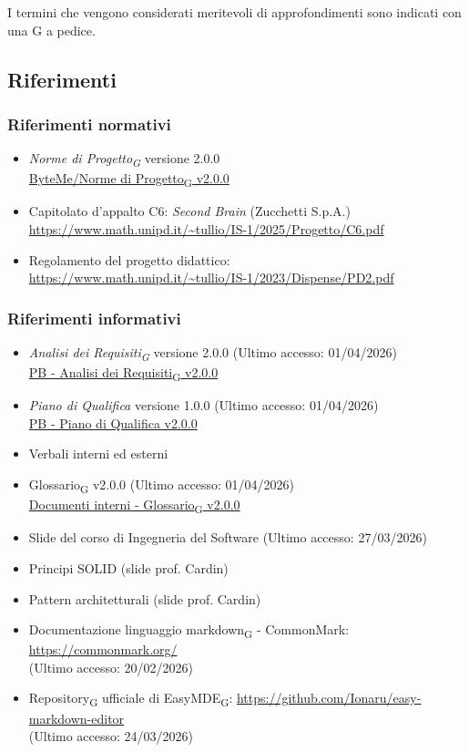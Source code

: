 \documentclass[11pt,a4paper]{article}
\newcommand{\gls}[1]{#1\textsubscript{G}}
\begin{document}
I termini che vengono considerati meritevoli di approfondimenti sono indicati con una G a pedice.

\subsection{Riferimenti}
\subsubsection{Riferimenti normativi}
\begin{itemize}
  \item \textit{\gls{Norme di Progetto}} versione 2.0.0\\
  \href{https://byteme25.github.io/ByteMe/files.html}{ByteMe/\gls{Norme di Progetto} v2.0.0}
  \item Capitolato d'appalto C6: \textit{Second Brain} (Zucchetti S.p.A.)\\ \url{https://www.math.unipd.it/~tullio/IS-1/2025/Progetto/C6.pdf}
  \item Regolamento del progetto didattico:\\
        \url{https://www.math.unipd.it/~tullio/IS-1/2023/Dispense/PD2.pdf}
\end{itemize}

\subsubsection{Riferimenti informativi}
\begin{itemize}
    \item \textit{\gls{Analisi dei Requisiti}} versione 2.0.0 (Ultimo accesso: 01/04/2026)\\
    \href{https://byteme25.github.io/ByteMe/}{PB - \gls{Analisi dei Requisiti} v2.0.0}
    \item \textit{Piano di Qualifica} versione 1.0.0 (Ultimo accesso: 01/04/2026) \\
    \href{https://byteme25.github.io/ByteMe/}{PB - Piano di Qualifica v2.0.0}
    \item Verbali interni ed esterni
    \item \gls{Glossario} v2.0.0 (Ultimo accesso: 01/04/2026)\\
    \href{https://byteme25.github.io/ByteMe/files.html}{Documenti interni - \gls{Glossario} v2.0.0}
    
    \item Slide del corso di Ingegneria del Software (Ultimo accesso: 27/03/2026)
    \item Principi SOLID (slide prof. Cardin)
    \item Pattern architetturali (slide prof. Cardin)

    \item Documentazione linguaggio \gls{markdown} - CommonMark: \url{https://commonmark.org/}\\ (Ultimo accesso: 20/02/2026)
    \item \gls{Repository} ufficiale di \gls{EasyMDE}: \url{https://github.com/Ionaru/easy-markdown-editor}\\ (Ultimo accesso: 24/03/2026)
\end{itemize}
\end{document}
